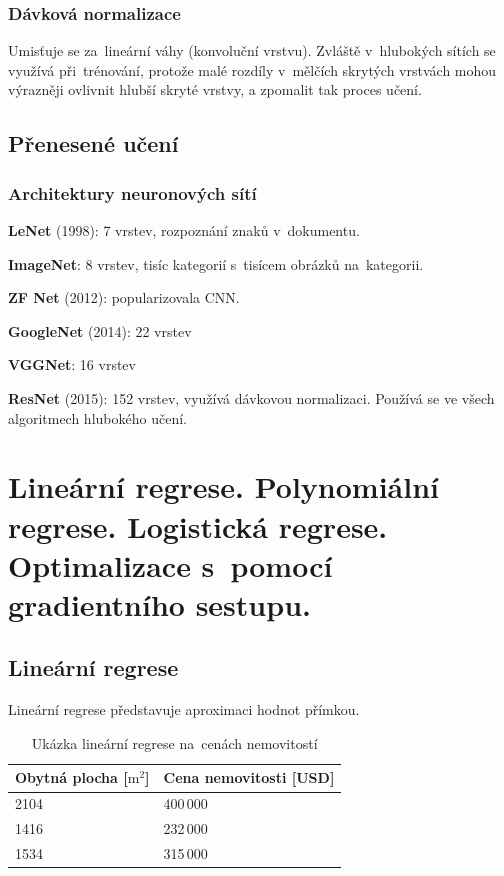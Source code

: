 \subsubsection{Dávková normalizace}

Umisťuje se za~lineární váhy (konvoluční vrstvu).
Zvláště v~hlubokých sítích se využívá při~trénování, protože malé rozdíly v~mělčích skrytých vrstvách mohou výrazněji ovlivnit hlubší skryté vrstvy, a zpomalit tak proces učení.

\subsection{Přenesené učení}


\subsubsection{Architektury neuronových sítí}


\textbf{LeNet} (1998): 7 vrstev, rozpoznání znaků v~dokumentu.

\textbf{ImageNet}: 8 vrstev, tisíc kategorií s~tisícem obrázků na~kategorii.

\textbf{ZF Net} (2012): popularizovala CNN.

\textbf{GoogleNet} (2014): 22 vrstev

\textbf{VGGNet}: 16 vrstev

\textbf{ResNet} (2015): 152 vrstev, využívá dávkovou normalizaci. Používá se ve všech algoritmech hlubokého učení.

\clearpage
\section{Lineární regrese. Polynomiální regrese. Logistická regrese. Optimalizace s~pomocí gradientního sestupu.}

\subsection{Lineární regrese}

Lineární regrese představuje aproximaci hodnot přímkou.

\begin{table}[h]
	\centering
	\begin{tabular}{ |l|l| }
    Obytná plocha [$\text{m}^2$] & Cena nemovitosti [USD] \\ \hline \hline
    2104 & 400\,000 \\ \hline
    1416 & 232\,000 \\ \hline
    1534 & 315\,000 \\ \hline
	\end{tabular}
	\caption{Ukázka lineární regrese na~cenách nemovitostí}
    \label{tabulka-linearni-regrese}
\end{table}

